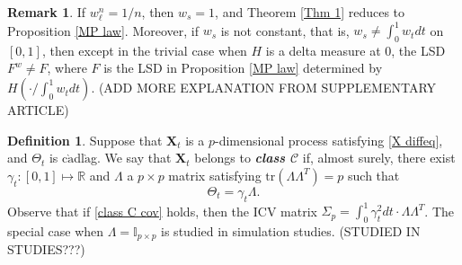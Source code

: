 \documentclass[a4paper,11pt]{article}
\theoremstyle{plain}
\theoremstyle{definition}
\newtheorem{defn}[thm]{Definition}
\newtheorem{rmrk}[thm]{Remark}
\newcommand{\MR}{\mathbb{R}}
\newcommand{\tr}{\mathrm{tr}}
\newcommand{\define}[1]{\textit{\textbf{#1}}}
\begin{document}
    \begin{rmrk}
    	If $w_\ell^n = 1/n$, then $w_s=1$, and Theorem \ref{Thm 1} reduces to Proposition \ref{MP law}. Moreover, if $w_s$ is not constant, that is, $w_s \neq \int_{0}^{1} w_t dt$ on $[0, 1]$, then except in the trivial case when $H$ is a delta measure at $0$, the LSD $F^w \neq F$, where $F$ is the LSD in Proposition \ref{MP law} determined by $H(\cdot / \int_{0}^{1} w_t dt)$. (ADD MORE EXPLANATION FROM SUPPLEMENTARY ARTICLE)
    \end{rmrk}
    
    \begin{defn}
   		Suppose that $\mathbf{X}_t$ is a $p$-dimensional process satisfying \eqref{X diffeq}, and $\Theta_t$ is c$\grave{\text{a}}$dl$\grave{\text{a}}$g. We say that $\mathbf{X}_t$ belongs to \define{class $\mathcal{C}$} if, almost surely, there exist $\gamma_t: [0, 1] \mapsto \MR$ and $\Lambda$ a $p \times p$ matrix satisfying $\tr(\Lambda \Lambda^T) = p$ such that 
   		\begin{equation} \label{class C cov}
   		\Theta_t = \gamma_t \Lambda.
   		\end{equation}
   		Observe that if \eqref{class C cov} holds, then the ICV matrix $\Sigma_p = \int_{0}^{1} \gamma_t^2 dt \cdot \Lambda \Lambda^T$. The special case when $\Lambda = \mathbb{I}_{p \times p}$ is studied in simulation studies. (STUDIED IN STUDIES???)
   	\end{defn}
    		
\end{document}
